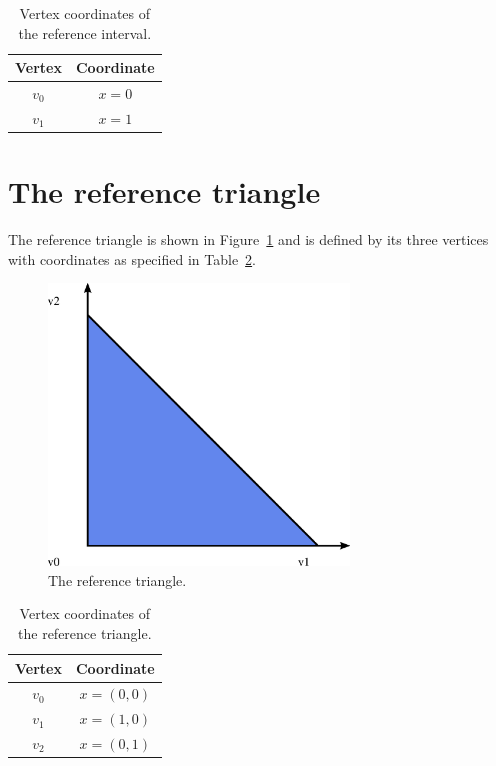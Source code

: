 \begin{table}
\linespread{1.2}\selectfont
  \begin{center}
    \begin{tabular}{|c|c|}
      \hline
      Vertex & Coordinate \\
      \hline
      \hline
      $v_0$ & $x = 0$ \\
      \hline
      $v_1$ & $x = 1$ \\
      \hline
    \end{tabular}
    \caption{Vertex coordinates of the reference interval.}
    \label{tab:interval,vertices}
  \end{center}
\end{table}

\section{The reference triangle}

The reference triangle is shown in Figure~\ref{fig:triangle} and is
defined by its three vertices with coordinates as specified in
Table~\ref{tab:triangle,vertices}.

\begin{figure}
  \begin{center}
    \includegraphics[width=8cm]{eps/triangle.eps}
    \caption{The reference triangle.}
    \label{fig:triangle}
  \end{center}
\end{figure}

\begin{table}
\linespread{1.2}\selectfont
  \begin{center}
    \begin{tabular}{|c|c|}
      \hline
      Vertex & Coordinate \\
      \hline
      \hline
      $v_0$ & $x = (0, 0)$ \\
      \hline
      $v_1$ & $x = (1, 0)$ \\
      \hline
      $v_2$ & $x = (0, 1)$ \\
      \hline
    \end{tabular}
    \caption{Vertex coordinates of the reference triangle.}
    \label{tab:triangle,vertices}
  \end{center}
\end{table}

